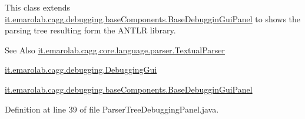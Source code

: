This class extends \hyperlink{classit_1_1emarolab_1_1cagg_1_1debugging_1_1baseComponents_1_1BaseDebugginGuiPanel}{it.\-emarolab.\-cagg.\-debugging.\-base\-Components.\-Base\-Debuggin\-Gui\-Panel} to shows the parsing tree resulting form the A\-N\-T\-L\-R library. 

\begin{DoxySeeAlso}{See Also}
\hyperlink{classit_1_1emarolab_1_1cagg_1_1core_1_1language_1_1parser_1_1TextualParser}{it.\-emarolab.\-cagg.\-core.\-language.\-parser.\-Textual\-Parser} 

\hyperlink{classit_1_1emarolab_1_1cagg_1_1debugging_1_1DebuggingGui}{it.\-emarolab.\-cagg.\-debugging.\-Debugging\-Gui} 

\hyperlink{classit_1_1emarolab_1_1cagg_1_1debugging_1_1baseComponents_1_1BaseDebugginGuiPanel}{it.\-emarolab.\-cagg.\-debugging.\-base\-Components.\-Base\-Debuggin\-Gui\-Panel} 
\end{DoxySeeAlso}


Definition at line 39 of file Parser\-Tree\-Debugging\-Panel.\-java.



